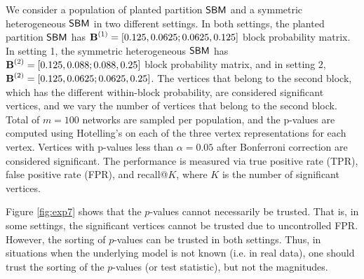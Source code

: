 We consider a population of planted partition $\operatorname{\mathsf{SBM}}$ and a symmetric heterogeneous $\operatorname{\mathsf{SBM}}$ in two different settings. In both settings, the planted partition $\operatorname{\mathsf{SBM}}$ has $\operatorname{\mathbf{B}}^{(1)} = [0.125, 0.0625; 0.0625, 0.125]$ block probability matrix. In setting 1, the symmetric heterogeneous $\operatorname{\mathsf{SBM}}$ has  $\operatorname{\mathbf{B}}^{(2)} = [0.125, 0.088; 0.088, 0.25]$ block probability matrix, and in setting 2, $\operatorname{\mathbf{B}}^{(2)} = [0.125,  0.0625; 0.0625, 0.25]$. The vertices that belong to the second block, which has the different within-block probability, are considered significant vertices, and we vary the number of vertices that belong to the second block. Total of $m=100$ networks are sampled per population, and the p-values are computed using Hotelling's on each of the three vertex representations for each vertex. Vertices with p-values less than $\alpha=0.05$ after Bonferroni correction are considered significant. The performance is measured via true positive rate (TPR), false positive rate (FPR), and recall@$K$, where $K$ is the number of significant vertices. 

Figure \ref{fig:exp7} shows that the $p$-values cannot necessarily be trusted. That is, in some settings, the significant vertices cannot be trusted due to uncontrolled FPR. However, the sorting of $p$-values can be trusted in both settings. Thus, in situations when the underlying model is not known (i.e. in real data), one should trust the sorting of the $p$-values (or test statistic), but not the magnitudes. 

